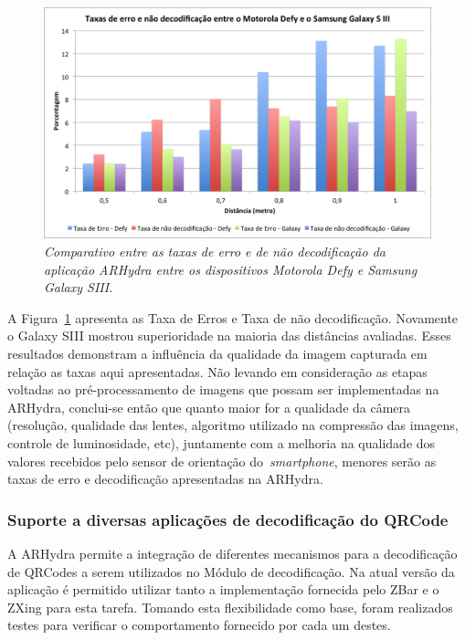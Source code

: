 	\begin{figure}[htb] 
		\centering \includegraphics[scale=0.55]{figuras/cap4/grafico_taxas_defy_s3.png}
		\caption{\textit{Comparativo entre as taxas de erro e de não decodificação da aplicação ARHydra entre os 
						dispositivos Motorola Defy e Samsung Galaxy SIII.}}
		\label{fig:testeCompTaxas} 
	\end{figure}
	
	A Figura~\ref{fig:testeCompTaxas} apresenta as Taxa de Erros e Taxa de não decodificação. Novamente o Galaxy SIII 
	mostrou superioridade na maioria das distâncias avaliadas. Esses resultados demonstram a influência da qualidade 
	da imagem capturada em relação as taxas aqui apresentadas. Não levando em consideração as etapas voltadas ao 
	pré-processamento de imagens que possam ser implementadas na ARHydra, conclui-se então que quanto maior for a qualidade da 
	câmera (resolução, qualidade das lentes, algoritmo utilizado na compressão das imagens, controle de luminosidade, etc), 
	juntamente com a melhoria na qualidade dos valores recebidos pelo sensor de orientação do~\textit{smartphone}, menores 
	serão as taxas de erro e decodificação apresentadas na ARHydra. 
	
\subsubsection{Suporte a diversas aplicações de decodificação do QRCode}

	A ARHydra permite a integração de diferentes mecanismos para a decodificação de QRCodes a serem utilizados no Módulo 
	de decodificação. Na atual versão da aplicação é permitido utilizar tanto a implementação fornecida pelo ZBar e o 
	ZXing para esta tarefa. Tomando esta flexibilidade como base, foram realizados testes para verificar o comportamento 
	fornecido por cada um destes. 
	
